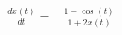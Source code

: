 \begin{align}
\frac{dx(t)}{dt} =& \frac{1 + \cos\left( t \right)}{1 + 2 x\left( t \right)}
\end{align}
